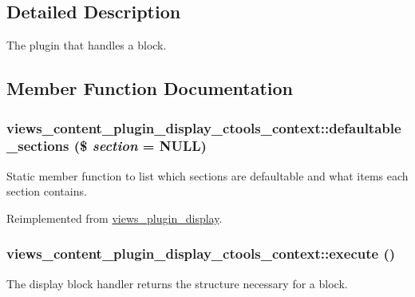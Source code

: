 \subsection{Detailed Description}
The plugin that handles a block. 

\subsection{Member Function Documentation}
\hypertarget{classviews__content__plugin__display__ctools__context_aac45cef6f7701e14689186da1cf10b92}{
\subsubsection[{defaultable\_\-sections}]{\setlength{\rightskip}{0pt plus 5cm}views\_\-content\_\-plugin\_\-display\_\-ctools\_\-context::defaultable\_\-sections (\$ {\em section} = {\ttfamily NULL})}}
\label{classviews__content__plugin__display__ctools__context_aac45cef6f7701e14689186da1cf10b92}
Static member function to list which sections are defaultable and what items each section contains. 

Reimplemented from \hyperlink{classviews__plugin__display_a1ff9cd1b5762dde8765e608efdec8ec4}{views\_\-plugin\_\-display}.\hypertarget{classviews__content__plugin__display__ctools__context_a45d28ca00a2dc732cf72be0ea0318895}{
\subsubsection[{execute}]{\setlength{\rightskip}{0pt plus 5cm}views\_\-content\_\-plugin\_\-display\_\-ctools\_\-context::execute ()}}
\label{classviews__content__plugin__display__ctools__context_a45d28ca00a2dc732cf72be0ea0318895}
The display block handler returns the structure necessary for a block. 

